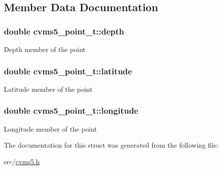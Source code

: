 \subsection{Member Data Documentation}
\hypertarget{structcvms5__point__t_ad1f5b60d171202bf9c0a7b84b84eff2a}{
\subsubsection[{depth}]{\setlength{\rightskip}{0pt plus 5cm}double cvms5\+\_\+point\+\_\+t\+::depth}}\label{structcvms5__point__t_ad1f5b60d171202bf9c0a7b84b84eff2a}
Depth member of the point \hypertarget{structcvms5__point__t_a0d0ac87897769f0246fbe820e8e642e0}{
\subsubsection[{latitude}]{\setlength{\rightskip}{0pt plus 5cm}double cvms5\+\_\+point\+\_\+t\+::latitude}}\label{structcvms5__point__t_a0d0ac87897769f0246fbe820e8e642e0}
Latitude member of the point \hypertarget{structcvms5__point__t_af9876379c7c09e9037e15ea0db3af896}{
\subsubsection[{longitude}]{\setlength{\rightskip}{0pt plus 5cm}double cvms5\+\_\+point\+\_\+t\+::longitude}}\label{structcvms5__point__t_af9876379c7c09e9037e15ea0db3af896}
Longitude member of the point 

The documentation for this struct was generated from the following file\+:\begin{DoxyCompactItemize}
\item 
src/\hyperlink{cvms5_8h}{cvms5.\+h}\end{DoxyCompactItemize}
